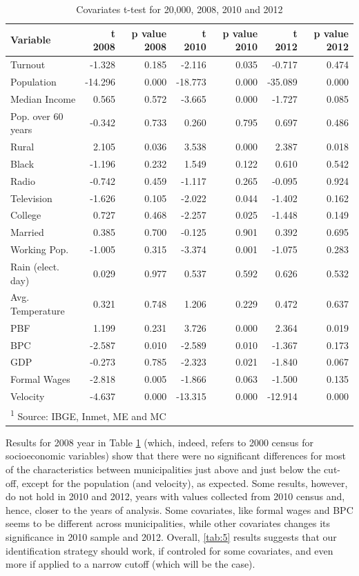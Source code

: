 \documentclass[12pt,]{article}
\begin{document}
\begin{table}[!h]

\caption{\label{tab:t.test}Covariates t-test for 20,000, 2008, 2010 and 2012}
\centering
\begin{tabular}{lrrrrrr}
\toprule
Variable & t 2008 & p value 2008 & t 2010 & p value 2010 & t 2012 & p value 2012\\
\midrule
Turnout & -1.328 & 0.185 & -2.116 & 0.035 & -0.717 & 0.474\\
Population & -14.296 & 0.000 & -18.773 & 0.000 & -35.089 & 0.000\\
Median Income & 0.565 & 0.572 & -3.665 & 0.000 & -1.727 & 0.085\\
Pop. over 60 years & -0.342 & 0.733 & 0.260 & 0.795 & 0.697 & 0.486\\
Rural & 2.105 & 0.036 & 3.538 & 0.000 & 2.387 & 0.018\\
\addlinespace
Black & -1.196 & 0.232 & 1.549 & 0.122 & 0.610 & 0.542\\
Radio & -0.742 & 0.459 & -1.117 & 0.265 & -0.095 & 0.924\\
Television & -1.626 & 0.105 & -2.022 & 0.044 & -1.402 & 0.162\\
College & 0.727 & 0.468 & -2.257 & 0.025 & -1.448 & 0.149\\
Married & 0.385 & 0.700 & -0.125 & 0.901 & 0.392 & 0.695\\
\addlinespace
Working Pop. & -1.005 & 0.315 & -3.374 & 0.001 & -1.075 & 0.283\\
Rain (elect. day) & 0.029 & 0.977 & 0.537 & 0.592 & 0.626 & 0.532\\
Avg. Temperature & 0.321 & 0.748 & 1.206 & 0.229 & 0.472 & 0.637\\
PBF & 1.199 & 0.231 & 3.726 & 0.000 & 2.364 & 0.019\\
BPC & -2.587 & 0.010 & -2.589 & 0.010 & -1.367 & 0.173\\
\addlinespace
GDP & -0.273 & 0.785 & -2.323 & 0.021 & -1.840 & 0.067\\
Formal Wages & -2.818 & 0.005 & -1.866 & 0.063 & -1.500 & 0.135\\
Velocity & -4.637 & 0.000 & -13.315 & 0.000 & -12.914 & 0.000\\
\bottomrule
\multicolumn{7}{l}{\textsuperscript{1} Source: IBGE, Inmet, ME and MC}\\
\end{tabular}
\end{table}

Results for 2008 year in Table \ref{tab:t.test} (which, indeed, refers
to 2000 census for socioeconomic variables) show that there were no
significant differences for most of the characteristics between
municipalities just above and just below the cut-off, except for the
population (and velocity), as expected. Some results, however, do not
hold in 2010 and 2012, years with values collected from 2010 census and,
hence, closer to the years of analysis. Some covariates, like formal
wages and BPC seems to be different across municipalities, while other
covariates changes its significance in 2010 sample and 2012. Overall,
\ref{tab:5} results suggests that our identification strategy should
work, if controled for some covariates, and even more if applied to a
narrow cutoff (which will be the case).
\end{document}
